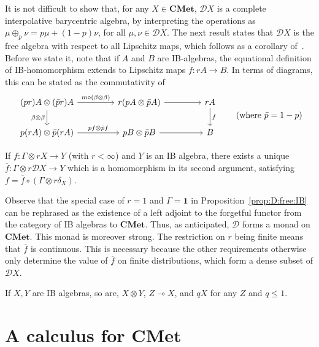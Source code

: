 \documentclass[a4paper,UKenglish,cleveref, autoref, thm-restate]{lipics-v2021}
\newcommand{\lol}{\mathbin{\multimap}}
\newcommand{\cat}[1]{\mathbf{#1}}
\newcommand{\CMet}{\cat{CMet}}
\newcommand{\mprod}{\otimes}
\newcommand{\mexp}{\lol}
\newcommand{\unit}{\mathbf{1}}
\newcommand{\D}{\mathcal{D}}
\newcommand{\asmap}{\beta} %
\begin{document}
It is not difficult to show that, for any $X \in \CMet$,
$\D X$ is a complete interpolative barycentric algebra, by interpreting the operations as 
$\mu \oplus_p \nu = p \mu + (1-p) \nu$, for all $\mu,\nu \in \D X$. 
The next result states that $\D X$ is the free algebra with respect to all Lipschitz maps, which follows as a corollary of~\cite[Theorem~3.8]{MardarePP18}.
Before we state it,  note that if $A$ and $B$ are IB-algebras, the equational definition of IB-homomorphism extends
to Lipschitz maps $f \colon rA \to B$. In terms of diagrams,  this can be stated as the commutativity of
\[
 \begin{tikzcd}[column sep=10ex]
  (pr)A \mprod (\bar pr) A \ar{r}{m \circ (\asmap\mprod\asmap)} \arrow[d,"\asmap\mprod\asmap"'] & r(pA \mprod \bar pA) \ar{r} & rA \ar{d}{f}  \\
  p(rA) \mprod \bar p(rA) \ar{r}{pf \mprod \bar p f} & pB \mprod \bar p B \ar{r} & B
 \end{tikzcd}
 \tag{where $\bar p = 1-p$}
\]

\begin{proposition} \label{prop:D:free:IB}
 If $f \colon \Gamma \mprod rX \to Y$ (with $r<\infty$) and $Y$ is an IB algebra, there exists a unique  $\overline f \colon \Gamma \mprod r\D X \to Y$
 which is a homomorphism in its second argument, satisfying 
 $f = \overline f \circ (\Gamma \mprod r\delta_X)$. 
\end{proposition}

Observe that the special case of $r=1$ and $\Gamma=\unit$ 
in Proposition~\ref{prop:D:free:IB} can be rephrased as the existence of a left adjoint to the forgetful functor from the category of IB algebras to $\CMet$.
Thus, as anticipated, $\D$ forms a monad on $\CMet$. This monad is moreover strong. The restriction on $r$ being finite means that 
$\overline f$ is continuous. This is necessary because the other requirements otherwise only
determine the value of $\overline f$ on finite distributions, which form a dense subset of $\D X$. 

\begin{lemma} \label{lem:IB:mexp:r}
 If $X,Y$ are IB algebras, so are, $X \mprod Y$, $Z \mexp X$, and $qX$ for any $Z$ and $q \leq 1$. 
\end{lemma}


\section{A calculus for $\CMet$}
\label{sec:calculus}
\end{document}
